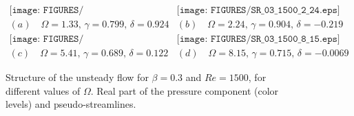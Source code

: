 \documentclass{jfm}
\begin{document}
\begin{figure}
$$
\begin{array}{cc}
\texttt{[image: FIGURES/SR\_03\_1500\_1\_33.eps]} &
\texttt{[image: FIGURES/SR\_03\_1500\_2\_24.eps]} \\
(a) \quad \Omega = 1.33, \, \gamma = 0.799,\, \delta =0.924 & 
(b) \quad \Omega = 2.24,  \, \gamma = 0.904,\, \delta =-0.219 \\
\texttt{[image: FIGURES/SR\_03\_1500\_5\_41.eps]} &
\texttt{[image: FIGURES/SR\_03\_1500\_8\_15.eps]} \\
(c) \quad \Omega = 5.41,  \, \gamma = 0.689,\, \delta =0.122 & 
(d) \quad \Omega = 8.15,  \, \gamma = 0.715,\, \delta =-0.0069
\end{array}
$$
\caption{ Structure of the unsteady flow for $\beta = 0.3$ and $Re = 1500$, for different values of $\Omega$.
Real part of the pressure component (color levels) and pseudo-streamlines. 
}
\label{fig:Struct03}
\end{figure}



\end{document}
